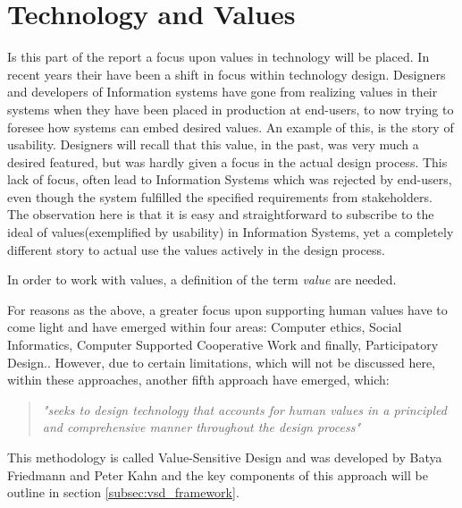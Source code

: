 
\section{Technology and Values}
Is this part of the report a focus upon values in technology will be placed.\newline 
In recent years their have been a shift in focus within technology design. Designers and developers of Information systems have gone from realizing values in their systems when they have been placed in production at end-users, to now trying to foresee how systems can embed desired values.\newline 
An example of this, is the story of usability. Designers will recall that this value, in the past, was very much a desired featured, but was hardly given a focus in the actual design process. This lack of focus, often lead to Information Systems which was rejected by end-users, even though the system fulfilled the specified requirements from stakeholders.\newline
The observation here is that it is easy and straightforward to subscribe to the ideal of values(exemplified by usability) in Information Systems, yet a completely different story to actual use the values actively in the design process.

In order to work with values, a definition of the term \textit{value} are needed. 
 \newline

For reasons as the above, a greater focus upon supporting human values have to come light and have emerged within four areas: Computer ethics, Social Informatics, Computer Supported Cooperative Work and finally, Participatory Design.\citep[p. 3]{FriedmanVSDandIS}. However, due to certain limitations, which will not be discussed here, within these approaches, another fifth approach have emerged, which: 
\begin{quotation}
\textit{"seeks to design technology that accounts for human values in a principled and comprehensive manner throughout the design process"} \citep[p. 1186]{HumanValuesEthicsAndDesign}
\end{quotation}

This methodology is called Value-Sensitive Design and was developed by Batya Friedmann and Peter Kahn and the key components of this approach will be outline in section \ref{subsec:vsd_framework}. 

